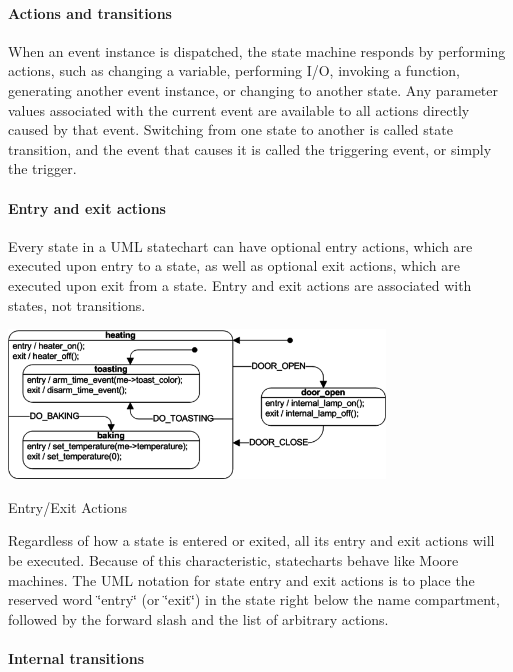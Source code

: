 \paragraph*{Actions and transitions}

When an event instance is dispatched, the state machine responds by performing actions, such as changing a variable, performing I/O, invoking a function, generating another event instance, or changing to another state. Any parameter values associated with the current event are available to all actions directly caused by that event. Switching from one state to another is called state transition, and the event that causes it is called the triggering event, or simply the trigger.

\paragraph*{Entry and exit actions}

Every state in a U\+ML statechart can have optional entry actions, which are executed upon entry to a state, as well as optional exit actions, which are executed upon exit from a state. Entry and exit actions are associated with states, not transitions.

 
\begin{DoxyImage}
\includegraphics[width=10cm]{entry_exit_actions.png}
\caption{Entry/\+Exit Actions}
\end{DoxyImage}


Regardless of how a state is entered or exited, all its entry and exit actions will be executed. Because of this characteristic, statecharts behave like Moore machines. The U\+ML notation for state entry and exit actions is to place the reserved word \char`\"{}entry\char`\"{} (or \char`\"{}exit\char`\"{}) in the state right below the name compartment, followed by the forward slash and the list of arbitrary actions.

\paragraph*{Internal transitions}

